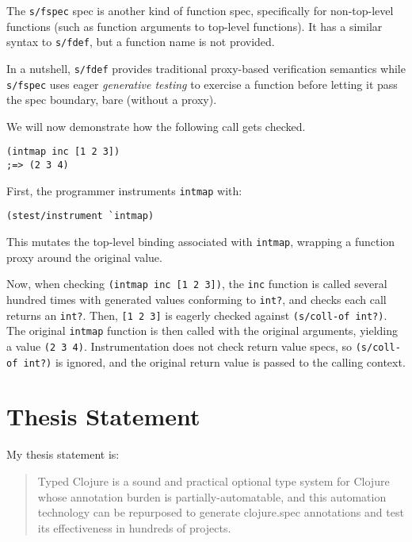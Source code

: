 \documentclass[9pt]{extarticle}
\begin{document}
The \texttt{s/fspec} spec is another kind of function spec,
specifically for non-top-level functions (such as function arguments
to top-level functions). It has a similar syntax to \texttt{s/fdef},
but a function name is not provided.

In a nutshell, \texttt{s/fdef} provides traditional proxy-based
verification semantics while \texttt{s/fspec} uses eager \emph{generative testing}
to exercise a function before letting it pass the spec boundary, bare (without a proxy).

We will now demonstrate how the following call gets checked.

\begin{verbatim}
(intmap inc [1 2 3])
;=> (2 3 4)
\end{verbatim}

First, the programmer instruments \texttt{intmap} with:

\begin{verbatim}
(stest/instrument `intmap)
\end{verbatim}

This mutates the top-level binding associated with \texttt{intmap}, wrapping a function
proxy around the original value.

Now, when checking \texttt{(intmap inc [1 2 3])}, the \texttt{inc} function is
called several hundred times with generated values conforming to \texttt{int?},
and checks each call returns an \texttt{int?}.
Then, \texttt{[1 2 3]} is eagerly checked against \texttt{(s/coll-of int?)}.
The original \texttt{intmap} function is then called with the original arguments,
yielding a value \texttt{(2 3 4)}. Instrumentation does not check return value specs,
so \texttt{(s/coll-of int?)} is ignored, and the original return value is passed to the calling
context.

\section{Thesis Statement}

My thesis statement is:

\begin{quotation}
Typed Clojure is a sound and practical optional type system for Clojure whose annotation burden is partially-automatable, and this automation technology can be repurposed to generate clojure.spec annotations and test its effectiveness in hundreds of projects.
\end{quotation}
\end{document}
